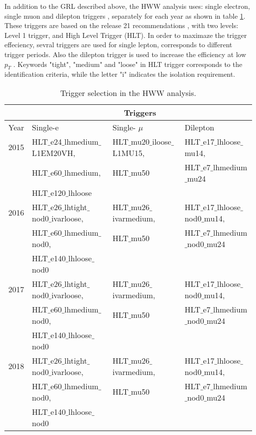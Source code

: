 In addition to the GRL described above, the HWW analysis uses: single electron, single muon and dilepton triggers \cite{Aggarwal2743995}, separately for each year as shown in table \ref{table2}. These triggers are based on the release 21 recommendations \cite{siteTrigger}, with two levels: Level 1 trigger, and High Level Trigger (HLT). In order to maximaze the trigger effeciency, sevral triggers are used for single lepton, corresponds to different trigger periods. Also the dilepton trigger is used to increase the efficiency at low $p_{T}$ \cite{Aggarwal2743995}. Keywords "tight", "medium" and "loose" in HLT trigger corresponds to the identification criteria, while the letter "i" indicates the isolation requirement\cite{Aggarwal2716687}.


\begin{table}[!htbp]
  \centering
\begin{tabular}{|l|l|l|l|}
\hline & \multicolumn{3}{|c|}{ Triggers } \\
\hline Year & Single-e & Single- $\mu$ & Dilepton \\
\hline 2015 & HLT$\_$e24$\_$lhmedium$\_$L1EM20VH, & HLT$\_$mu20$\_$iloose$\_$L1MU15, & HLT$\_$e17$\_$lhloose$\_$mu14, \\
& HLT$\_$e60$\_$lhmedium, & HLT$\_$mu50 & HLT$\_$e7$\_$lhmedium$\_$mu24 \\
& HLT$\_$e120$\_$lhloose & & \\
\hline 2016 & HLT$\_$e26$\_$lhtight$\_$nod0$\_$ivarloose, & HLT$\_$mu26$\_$ivarmedium, & HLT$\_$e17$\_$lhloose$\_$nod0$\_$mu14, \\
& HLT$\_$e60$\_$lhmedium$\_$nod0, & HLT$\_$mu50 & HLT$\_$e7$\_$lhmedium$\_$nod0$\_$mu24 \\
& HLT$\_$e140$\_$lhloose$\_$nod0 & & \\
\hline 2017 & HLT$\_$e26$\_$lhtight$\_$nod0$\_$ivarloose, & HLT$\_$mu26$\_$ivarmedium, & HLT$\_$e17$\_$lhloose$\_$nod0$\_$mu14, \\
& HLT$\_$e60$\_$lhmedium$\_$nod0, & HLT$\_$mu50 & HLT$\_$e7$\_$lhmedium$\_$nod0$\_$mu24 \\
& HLT$\_$e140$\_$lhloose$\_$nod0 & & \\
\hline 2018 & HLT$\_$e26$\_$lhtight$\_$nod0$\_$ivarloose, & HLT$\_$mu26$\_$ivarmedium, & HLT$\_$e17$\_$lhloose$\_$nod0$\_$mu14, \\
& HLT$\_$e60$\_$lhmedium$\_$nod0, & HLT$\_$mu50 & HLT$\_$e7$\_$lhmedium$\_$nod0$\_$mu24 \\
& HLT$\_$e140$\_$lhloose$\_$nod0 & & \\
\hline
\end{tabular}
\caption{Trigger selection in the HWW analysis.}
\label{table2}%
 \end{table}%



